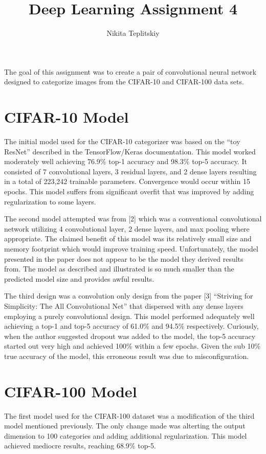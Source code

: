 \documentclass[]{article}
\title{Deep Learning Assignment 4}
\author{Nikita Teplitskiy}
\begin{document}
\maketitle

The goal of this assignment was to create a pair of convolutional neural network designed to categorize images from the CIFAR-10 and CIFAR-100 data sets. 

\section{CIFAR-10 Model}

The initial model used for the CIFAR-10 categorizer was based on the ``toy ResNet'' described in the TensorFlow/Keras documentation. This model worked moderately well achieving 76.9\% top-1 accuracy and 98.3\% top-5 accuracy. It consisted of 7 convolutional layers, 3 residual layers, and 2 dense layers resulting in a total of 223,242 trainable parameters. Convergence would occur within 15 epochs. This model suffers from significant overfit that was improved by adding regularization to some layers.  

The second model attempted was from [2] which was a conventional convolutional network utilizing 4 convolutional layer, 2 dense layers, and max pooling where appropriate. The claimed benefit of this model was its relatively small size and memory footprint which would improve training speed. Unfortunately, the model presented in the paper does not appear to be the model they derived results from. The model as described and illustrated is so much smaller than the predicted model size and provides awful results. 

The third design was a convolution only design from the paper [3] ``Striving for Simplicity: The All Convolutional Net'' that dispersed with any dense layers employing a purely convolutional design. This model performed adequately well achieving a top-1 and top-5 accuracy of 61.0\% and 94.5\% respectively. Curiously, when the author suggested dropout was added to the model, the top-5 accuracy started out very high and achieved 100\% within a few epochs. Given the sub 10\% true accuracy of the model, this erroneous result was due to misconfiguration. 

\section{CIFAR-100 Model}

The first model used for the CIFAR-100 dataset was a modification of the third model mentioned previously. The only change made was alterting the output dimension to 100 categories and adding additional regularization. This model achieved mediocre results, reaching 68.9\% top-5. 
\end{document}
